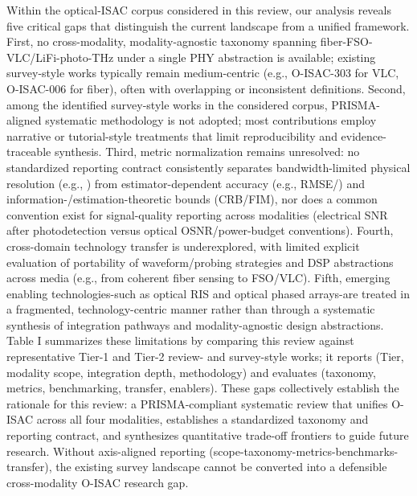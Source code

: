 {} Within the optical-ISAC corpus considered in this review, our analysis reveals five critical gaps that distinguish the current landscape from a unified framework. First, no cross-modality, modality-agnostic taxonomy spanning fiber-FSO-VLC/LiFi-photo-THz under a single PHY abstraction is available; existing survey-style works typically remain medium-centric (e.g., O-ISAC-303 for VLC, O-ISAC-006 for fiber), often with overlapping or inconsistent definitions. Second, among the identified survey-style works in the considered corpus, PRISMA-aligned systematic methodology is not adopted; most contributions employ narrative or tutorial-style treatments that limit reproducibility and evidence-traceable synthesis. Third, metric normalization remains unresolved: no standardized reporting contract consistently separates bandwidth-limited physical resolution (e.g., ) from estimator-dependent accuracy (e.g., RMSE/) and information-/estimation-theoretic bounds (CRB/FIM), nor does a common convention exist for signal-quality reporting across modalities (electrical SNR after photodetection versus optical OSNR/power-budget conventions). Fourth, cross-domain technology transfer is underexplored, with limited explicit evaluation of portability of waveform/probing strategies and DSP abstractions across media (e.g., from coherent fiber sensing to FSO/VLC). Fifth, emerging enabling technologies-such as optical RIS and optical phased arrays-are treated in a fragmented, technology-centric manner rather than through a systematic synthesis of integration pathways and modality-agnostic design abstractions. Table I summarizes these limitations by comparing this review against representative Tier-1 and Tier-2 review- and survey-style works; it reports  (Tier, modality scope, integration depth, methodology) and evaluates  (taxonomy, metrics, benchmarking, transfer, enablers).\markdownRendererParagraphSeparator
{}These gaps collectively establish the rationale for this review: a PRISMA-compliant systematic review that unifies O-ISAC across all four modalities, establishes a standardized taxonomy and reporting contract, and synthesizes quantitative trade-off frontiers to guide future research.\markdownRendererInterblockSeparator
{}\markdownRendererBlockQuoteBegin
{} Without axis-aligned reporting (scope-taxonomy-metrics-benchmarks-transfer), the existing survey landscape cannot be converted into a defensible cross-modality O-ISAC research gap.\markdownRendererBlockQuoteEnd \markdownRendererInterblockSeparator
